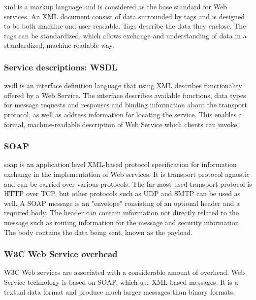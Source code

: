 \gls{xml} is a markup language and is considered as the base standard for Web
services. An XML document consist of data surrounded by tags and is designed
to be both machine and user readable. Tags describe the data they enclose. The
tags can be standardized, which allows exchange and understanding of data in a
standardized, machine-readable way.


\subsubsection{Service descriptions: WSDL}

\gls{wsdl} is an interface definition language that using XML describes
functionality offered by a Web Service. The interface describes available
functions, data types for message requests and responses and binding
information about the transport protocol, as well as address information for
locating the service. This enables a formal, machine-readable description of
Web Service which clients can invoke.


\subsubsection{SOAP}

\gls{soap} is an application level XML-based protocol specification for
information exchange in the implementation of Web services. It is transport
protocol agnostic and can be carried over various protocols. The far most used
transport protocol is HTTP over TCP, but other protocols such as UDP and SMTP
can be used as well. A SOAP message is an "envelope" consisting of an optional
header and a required body. The header can contain information not directly
related to the message such as routing information for the message and
security information. The body contains the data being sent, known as the
payload.

\subsubsection{W3C Web Service overhead}

W3C Web services are associated with a considerable amount of overhead. Web
Service technology is based on SOAP, which use XML-based messages. It is a
textual data format and produce much larger messages than binary formats.


\subsection{}
\label{rest}

